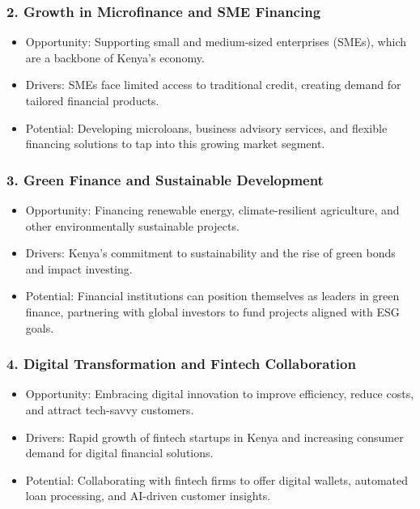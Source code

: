 \documentclass[10pt]{article}
\begin{document}
\subsubsection*{2. Growth in Microfinance and SME Financing}
\begin{itemize}
  \item Opportunity: Supporting small and medium-sized enterprises (SMEs), which are a backbone of Kenya's economy.
  \item Drivers: SMEs face limited access to traditional credit, creating demand for tailored financial products.
  \item Potential: Developing microloans, business advisory services, and flexible financing solutions to tap into this growing market segment.
\end{itemize}

\subsubsection*{3. Green Finance and Sustainable Development}

\begin{itemize}
  \item Opportunity: Financing renewable energy, climate-resilient agriculture, and other environmentally sustainable projects.
  \item Drivers: Kenya's commitment to sustainability and the rise of green bonds and impact investing.
  \item Potential: Financial institutions can position themselves as leaders in green finance, partnering with global investors to fund projects aligned with ESG goals.
\end{itemize}

\subsubsection*{4. Digital Transformation and Fintech Collaboration}
\begin{itemize}
  \item Opportunity: Embracing digital innovation to improve efficiency, reduce costs, and attract tech-savvy customers.
  \item Drivers: Rapid growth of fintech startups in Kenya and increasing consumer demand for digital financial solutions.
  \item Potential: Collaborating with fintech firms to offer digital wallets, automated loan processing, and AI-driven customer insights.
\end{itemize}
\end{document}
